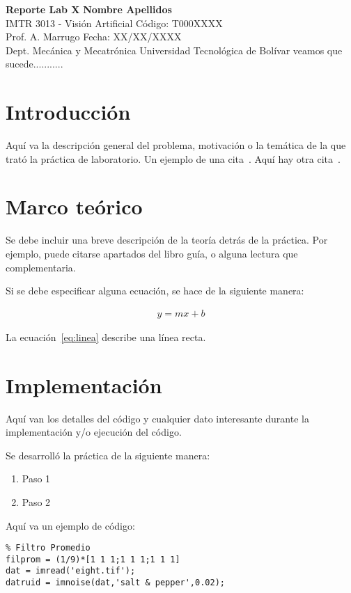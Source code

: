 \documentclass[a4paper, 11pt]{article}
\begin{document}
\noindent
\large\textbf{Reporte Lab X } \hfill \textbf{Nombre Apellidos} \\
\normalsize IMTR 3013 - Visión Artificial \hfill Código: T000XXXX \\
Prof. A. Marrugo \hfill Fecha: XX/XX/XXXX \\
Dept. Mecánica y Mecatrónica \hfill Universidad Tecnológica de Bolívar veamos que sucede...........

\section*{Introducción}
Aquí va la descripción general del problema, motivación o la temática de la que trató la práctica de laboratorio. Un ejemplo de una cita~\cite[p.219]{Robotics}. Aquí hay otra cita~\cite{Flueck}.

\section*{Marco teórico}
Se debe incluir una breve descripción de la teoría detrás de la práctica. Por ejemplo, puede citarse apartados del libro guía, o alguna lectura que complementaria.

Si se debe especificar alguna ecuación, se hace de la siguiente manera:

\begin{align}
y = mx+b
\label{eq:linea}
\end{align}

La ecuación~\eqref{eq:linea} describe una línea recta.

\section*{Implementación}
Aquí van los detalles del código y cualquier dato interesante durante la implementación y/o ejecución del código.

Se desarrolló la práctica de la siguiente manera:
\begin{enumerate}
	\item Paso 1
	\item Paso 2
\end{enumerate}	

Aquí va un ejemplo de código:

\begin{verbatim}
% Filtro Promedio
filprom = (1/9)*[1 1 1;1 1 1;1 1 1]
dat = imread('eight.tif');
datruid = imnoise(dat,'salt & pepper',0.02);
\end{verbatim}
\end{document}
